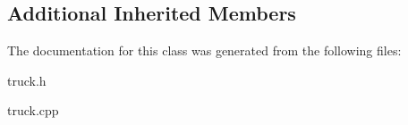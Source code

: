 \subsection*{Additional Inherited Members}


The documentation for this class was generated from the following files\+:\begin{DoxyCompactItemize}
\item 
truck.\+h\item 
truck.\+cpp\end{DoxyCompactItemize}
